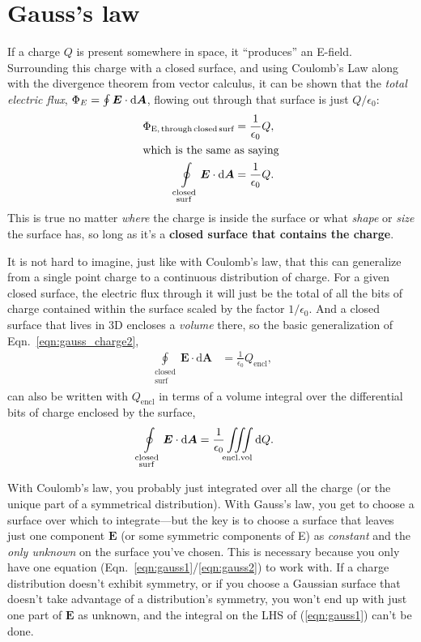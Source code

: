 \documentclass[10pt,letterpaper,twoside]{article}
\begin{document}
\section{Gauss's law}
If a charge $Q$ is present somewhere in space, it ``produces'' an E-field.
Surrounding this charge with a closed surface, and using Coulomb's Law along with the divergence theorem from vector calculus, it can be shown that the \textit{total electric flux}, $\Phi_E=\oint\bm E\cdot \text d \bm A$, flowing out through that surface is just $Q/\epsilon_0$:
\begin{align}
  \Phi_{\text{E,\,through\,closed\,surf}} &= \frac{1}{\epsilon_0}Q, \label{eqn:gauss_charge1}\\
  \intertext{which is the same as saying}
  \oint\limits_{\substack{\mathrm{closed}\\\mathrm{surf}}} \bm E\cdot \mathrm{d}\bm A &= \frac{1}{\epsilon_0}Q. \label{eqn:gauss_charge2}
\end{align}
This is true no matter \textit{where} the charge is inside the surface or what \textit{shape} or \textit{size} the surface has, so long as it's a \textbf{closed surface that contains the charge}.

It is not hard to imagine, just like with Coulomb's law, that this can generalize from a single point charge to a continuous distribution of charge.
For a given closed surface, the electric flux through it will just be the total of all the bits of charge contained within the surface scaled by the factor $1/\epsilon_0$.
And a closed surface that lives in 3D encloses a \textit{volume} there, so the basic generalization of Eqn.~\ref{eqn:gauss_charge2},
\begin{align}
  \oint\limits_{\substack{\mathrm{closed}\\\mathrm{surf}}} \bm E\cdot \mathrm{d}\bm A &= \frac{1}{\epsilon_0}Q_{\mathrm{encl}},
  \label{eqn:gauss1}
\end{align}
can also be written with $Q_\text{encl}$ in terms of a volume integral over the differential bits of charge enclosed by the surface,
\begin{align}
  \oint\limits_{\substack{\mathrm{closed}\\\mathrm{surf}}} \bm E\cdot \mathrm{d}\bm A &= \frac{1}{\epsilon_0}\iiint\limits_\mathrm{encl. vol} \text d Q.
  \label{eqn:gauss2}
\end{align}

With Coulomb's law, you probably just integrated over all the charge (or the unique part of a symmetrical distribution).
With Gauss's law, you get to choose a surface over which to integrate---but the key is to choose a surface that leaves just one component $\bm E$ (or some symmetric components of E) as \textit{constant} and the \textit{only unknown} on the surface you've chosen.
This is necessary because you only have one equation (Eqn.~\ref{eqn:gauss1}/\ref{eqn:gauss2}) to work with.
If a charge distribution doesn't exhibit symmetry, or if you choose a Gaussian surface that doesn't take advantage of a distribution's symmetry, you won't end up with just one part of $\bm E$ as unknown, and the integral on the LHS of (\ref{eqn:gauss1}) can't be done.
\end{document}
